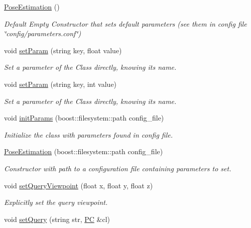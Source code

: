 \begin{DoxyCompactItemize}
\item 
\hyperlink{classPoseEstimation_a47946518bc5a77dea91403373a1245d5}{Pose\-Estimation} ()
\begin{DoxyCompactList}\small\item\em Default Empty Constructor that sets default parameters (see them in config file \char`\"{}config/parameters.\-conf\char`\"{}) \end{DoxyCompactList}\item 
void \hyperlink{classPoseEstimation_ae416bbbfdefdb60a6f82a9b255edc124}{set\-Param} (string key, float value)
\begin{DoxyCompactList}\small\item\em Set a parameter of the Class directly, knowing its name. \end{DoxyCompactList}\item 
void \hyperlink{classPoseEstimation_a1d768a589eb6424d936afb9f15d28067}{set\-Param} (string key, int value)
\begin{DoxyCompactList}\small\item\em Set a parameter of the Class directly, knowing its name. \end{DoxyCompactList}\item 
void \hyperlink{classPoseEstimation_a8359f6ffae7fc0cf99692d926dd1e7c4}{init\-Params} (boost\-::filesystem\-::path config\-\_\-file)
\begin{DoxyCompactList}\small\item\em Initialize the class with parameters found in config file. \end{DoxyCompactList}\item 
\hyperlink{classPoseEstimation_a4fcf971c444b8feb1de5ee99c66533df}{Pose\-Estimation} (boost\-::filesystem\-::path config\-\_\-file)
\begin{DoxyCompactList}\small\item\em Constructor with path to a configuration file containing parameters to set. \end{DoxyCompactList}\item 
void \hyperlink{classPoseEstimation_a378321aa07ca329332f20ba8bf6ffaad}{set\-Query\-Viewpoint} (float x, float y, float z)
\begin{DoxyCompactList}\small\item\em Explicitly set the query viewpoint. \end{DoxyCompactList}\item 
void \hyperlink{classPoseEstimation_a8c3e730167d42d2d8cfd4a08389d17ce}{set\-Query} (string str, \hyperlink{PoseEstimation__interface_8h_a62eb21fcfa3189c5de50fb62a2a7a79e}{P\-C} \&cl)

\end{DoxyCompactItemize}
